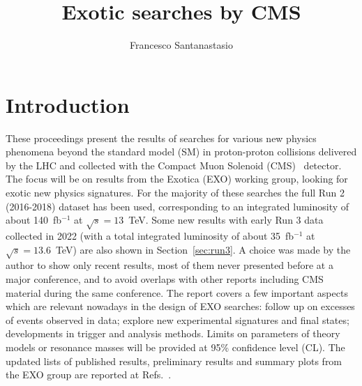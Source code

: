 \documentclass{moriond}
\begin{document}
\vspace*{4cm}
\title{Exotic searches by CMS}

\author{Francesco Santanastasio}

\address{Sapienza, Universit\`a di Roma ed INFN Sezione di Roma on
  behalf of the CMS Collaboration}

\maketitle{}

\section{Introduction}

These proceedings present the results of searches for various new physics phenomena beyond the standard model (SM) in proton-proton
collisions delivered by the LHC and collected with the Compact Muon Solenoid (CMS)~\cite{CMS:2008xjf,CMS:2023gfb}
detector. The focus will be on results from the Exotica (EXO) working
group, looking for exotic new physics signatures. For the majority of these searches the full Run 2
(2016-2018) dataset has been used, corresponding to an integrated
luminosity of about 140~fb$^{-1}$ at  $\sqrt{s}=13$~TeV. Some new results with early Run 3
data collected in 2022 (with a total integrated luminosity of
about 35~fb$^{-1}$ at  $\sqrt{s}=13.6$~TeV) are also shown in Section~\ref{sec:run3}.
A choice was made by the author to show only recent results, most of
them never presented before at a major conference, and to avoid overlaps with
other reports including CMS material during the same conference. The
report covers a few important aspects which are relevant nowadays
in the design of EXO searches: follow up on excesses of events
observed in data; explore new experimental signatures and final states;
developments in trigger and analysis methods. Limits on parameters of
theory models or resonance masses will be provided at 95\% confidence level
(CL). The updated lists of published results,
preliminary results and summary plots from the EXO group are reported at Refs.~\cite{CMS:EXOpub,CMS:EXOprel,CMS:EXOsum}.
\end{document}
